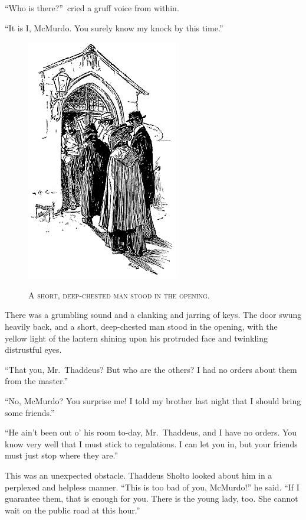 \documentclass[12pt,english,oneside]{book}
\newcommand{\noun}[1]{\textsc{#1}}
\begin{document}
{}``Who is there?''\ cried a gruff voice from within.

{}``It is I, McMurdo. You surely know my knock by this time.''

%
\begin{figure}[htbp]
\noindent \begin{center}\includegraphics{images/sign410-sign-06.png}\end{center}

\noindent \begin{center}\noun{A short, deep-chested man stood in
the opening.}\end{center}
\end{figure}
There was a grumbling sound and a clanking and jarring of keys. The
door swung heavily back, and a short, deep-chested man stood in the
opening, with the yellow light of the lantern shining upon his protruded
face and twinkling distrustful eyes.

{}``That you, Mr.\ Thaddeus? But who are the others? I had no orders
about them from the master.''

{}``No, McMurdo? You surprise me! I told my brother last night that
I should bring some friends.''

{}``He ain't been out o' his room to-day, Mr.\ Thaddeus, and I have
no orders. You know very well that I must stick to regulations. I
can let you in, but your friends must just stop where they are.''

This was an unexpected obstacle. Thaddeus Sholto looked about him
in a perplexed and helpless manner. {}``This is too bad of you, McMurdo!''
he said. {}``If I guarantee them, that is enough for you. There is
the young lady, too. She cannot wait on the public road at this hour.''
\end{document}
